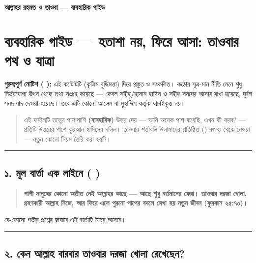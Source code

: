 

\begin{center}{\Large\bfseries\color{emerald} আল্লাহর রহমত ও তাওবা — ব্যবহারিক গাইড}\end{center}
\vspace{1em}
\section*{ব্যবহারিক গাইড — হতাশা নয়, ফিরে আসা: তাওবার পথ ও যাত্রা}

\begin{warnbox}
 \textbf{গুরুত্বপূর্ণ নোটিশ ( ):} এই কন্টেন্টটি  (কৃত্রিম বুদ্ধিমত্তা) দিয়ে প্রস্তুত ও সংকলিত।  কঠোর সূত্র-মান নীতি মেনে শুধু নির্ভরযোগ্য উৎস থেকে তথ্য সংগ্রহ করেছে — কেবল সহীহ/হাসান হাদিস ও সহীহ সনদের আসার রাখা হয়েছে, দুর্বল সনদ বাদ দেওয়া হয়েছে। তবে এটি কোনো আলেম বা মুহাদ্দিস কর্তৃক যাচাইকৃত নয়।
\end{warnbox}

\begin{quote}
এই ফাইলটি তত্ত্বের পাশাপাশি \textbf{ (ব্যবহারিক)} উত্তর দেয় — আমি অনেক পাপ করেছি, এখন কী করব? — প্রতিটি উত্তরের পাশে কুরআন-হাদিসের দলিল। তাওবার শর্তাবলি উলামাদের প্রতিষ্ঠিত () বক্তব্য থেকে নেওয়া — নতুন কোনো নিয়ম তৈরি করা হয়নি।
\end{quote}

\medskip\hrule\medskip

\subsection*{১. মূল বার্তা এক লাইনে (  )}

\begin{quote}
\textbf{পাপী মানুষের কোনো অতীত নেই আল্লাহর কাছে — আছে শুধু বর্তমানের ফেরা। তাওবার দরজা খোলা, গ্রহণকারী আল্লাহ নিজে, আর ফিরে এলে পুরনো পাপের বদলে লেখা হয় নতুন জীবন (ফুরকান ২৫:৭০)।}
\end{quote}

যে-কোনো গভীর প্রশ্নের জবাবে এই বার্তাটি ফিরে আসবে।

\medskip\hrule\medskip

\subsection*{২. কেন আল্লাহ বারবার তাওবার দরজা খোলা রেখেছেন?}

